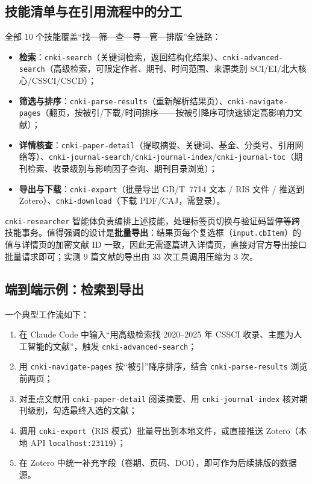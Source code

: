 \documentclass[UTF8, zihao=-4, fontset=fandol]{ctexart}
\begin{document}
\subsection{技能清单与在引用流程中的分工}

全部 10 个技能覆盖“找—筛—查—导—管—排版”全链路：

\begin{itemize}
  \item \textbf{检索}：\texttt{cnki-search}（关键词检索，返回结构化结果）、\texttt{cnki-advanced-search}（高级检索，可限定作者、期刊、时间范围、来源类别 SCI/EI/北大核心/CSSCI/CSCD）；
  \item \textbf{筛选与排序}：\texttt{cnki-parse-results}（重新解析结果页）、\texttt{cnki-navigate-pages}（翻页，按被引/下载/时间排序——按被引降序可快速锁定高影响力文献）；
  \item \textbf{详情核查}：\texttt{cnki-paper-detail}（提取摘要、关键词、基金、分类号、引用网络等）、\texttt{cnki-journal-search}/\texttt{cnki-journal-index}/\texttt{cnki-journal-toc}（期刊检索、收录级别与影响因子查询、期刊目录浏览）；
  \item \textbf{导出与下载}：\texttt{cnki-export}（批量导出 GB/T~7714 文本 / RIS 文件 / 推送到 Zotero）、\texttt{cnki-download}（下载 PDF/CAJ，需登录）。
\end{itemize}

\texttt{cnki-researcher} 智能体负责编排上述技能，处理标签页切换与验证码暂停等跨技能事务。值得强调的设计是\textbf{批量导出}：结果页每个复选框（\texttt{input.cbItem}）的值与详情页的加密文献 ID 一致，因此无需逐篇进入详情页，直接对官方导出接口批量请求即可；实测 9 篇文献的导出由 33 次工具调用压缩为 3 次\cite{cnki_skills}。

\subsection{端到端示例：检索到导出}

一个典型工作流如下：

\begin{enumerate}
  \item 在 Claude Code 中输入“用高级检索找 2020--2025 年 CSSCI 收录、主题为人工智能的文献”，触发 \texttt{cnki-advanced-search}；
  \item 用 \texttt{cnki-navigate-pages} 按“被引”降序排序，结合 \texttt{cnki-parse-results} 浏览前两页；
  \item 对重点文献用 \texttt{cnki-paper-detail} 阅读摘要、用 \texttt{cnki-journal-index} 核对期刊级别，勾选最终入选的文献；
  \item 调用 \texttt{cnki-export}（RIS 模式）批量导出到本地文件，或直接推送 Zotero（本地 API \texttt{localhost:23119}）\cite{cnki_skills,zotero}；
  \item 在 Zotero 中统一补充字段（卷期、页码、DOI），即可作为后续排版的数据源。
\end{enumerate}
\end{document}
